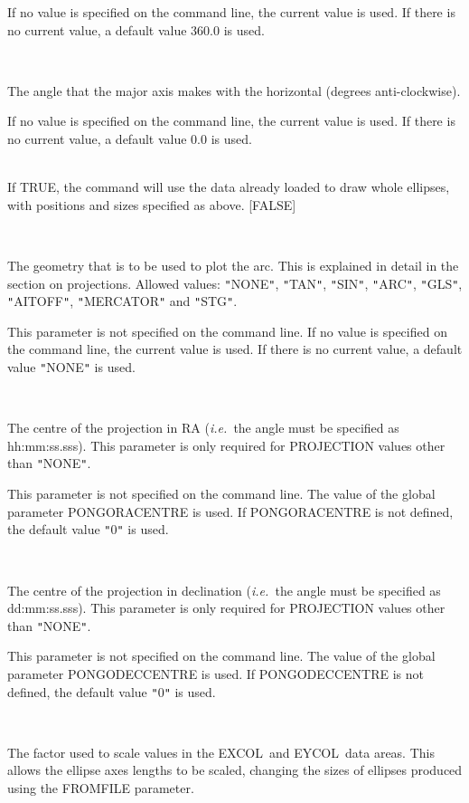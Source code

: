 \documentclass[twoside,11pt]{article}
\renewcommand{\_}{\texttt{\symbol{95}}}
\newcommand{\ie}{{\em i.e.\ }}
\newcommand{\excol}{{\sf EXCOL}}
\newcommand{\eycol}{{\sf EYCOL}}
\newcommand{\sstsubsection}[1]{ \item[{#1}] \mbox{} \\}
\newcommand{\sstsubsection}[1]{\item[{#1}]}
\begin{document}
{{{         If no value is specified on the command line, the current
         value is used. If there is no current value, a default value
         360.0 is used.
      }
      \sstsubsection{
         ROTATION = \_REAL (Read and Write)
      }{
         The angle that the major axis makes with the horizontal
         (degrees anti-clockwise).

         If no value is specified on the command line, the current
         value is used. If there is no current value, a default value
         0.0 is used.
      }
      \sstsubsection{
         FROMDATA = \_LOGICAL (Read)
      }{
         If TRUE, the command will use the data already loaded to draw
         whole ellipses, with positions and sizes specified as above.
         [FALSE]
      }
      \sstsubsection{
         PROJECTION = \_CHAR (Read)
      }{
         The geometry that is to be used to plot the arc.  This is
         explained in detail in the section on projections.  Allowed
         values: {\tt "}NONE{\tt "}, {\tt "}TAN{\tt "}, {\tt "}SIN{\tt "}, {\tt "}ARC{\tt "}, {\tt "}GLS{\tt "}, {\tt "}AITOFF{\tt "},
         {\tt "}MERCATOR{\tt "} and {\tt "}STG{\tt "}.

         This parameter is not specified on the command line. If no
         value is specified on the command line, the current value is
         used. If there is no current value, a default value {\tt "}NONE{\tt "} is
         used.
      }
      \sstsubsection{
         RACENTRE = \_CHAR (Read)
      }{
         The centre of the projection in RA (\ie the angle must be
         specified as hh:mm:ss.sss). This parameter is only required for
         PROJECTION values other than {\tt "}NONE{\tt "}.

         This parameter is not specified on the command line. The value
         of the global parameter PONGO\_RACENTRE is used. If
         PONGO\_RACENTRE is not defined, the default value {\tt "}0{\tt "} is used.
      }
      \sstsubsection{
         DECCENTRE = \_CHAR (Read)
      }{
         The centre of the projection in declination (\ie the angle
         must be specified as dd:mm:ss.sss). This parameter is only
         required for PROJECTION values other than {\tt "}NONE{\tt "}.

         This parameter is not specified on the command line. The value
         of the global parameter PONGO\_DECCENTRE is used. If
         PONGO\_DECCENTRE is not defined, the default value {\tt "}0{\tt "} is used.
      }
      \sstsubsection{
         ERSCALE = \_REAL (Read and Write)
      }{
         The factor used to scale values in the \excol\ and \eycol\ data
         areas. This allows the ellipse axes lengths to be scaled,
         changing the sizes of ellipses produced using the FROMFILE
         parameter.

}}}
\end{document}
